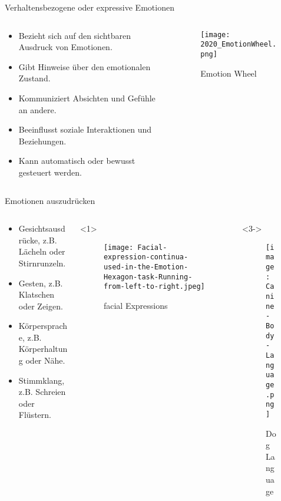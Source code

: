 \documentclass[aspectratio=169]{beamer}
\begin{document}
\begin{frame}{Verhaltensbezogene oder expressive Emotionen}
  \begin{columns}
    \begin{column}{0.7\textwidth}
      \begin{itemize}
        \item Bezieht sich auf den sichtbaren Ausdruck von Emotionen.
        \item Gibt Hinweise über den emotionalen Zustand.
        \item Kommuniziert Absichten und Gefühle an andere.
        \item Beeinflusst soziale Interaktionen und Beziehungen.
        \item Kann automatisch oder bewusst gesteuert werden.
      \end{itemize}
    \end{column}
    \begin{column}{0.3\textwidth}
      \begin{figure}[h]
        \centering
        \texttt{[image: 2020\_EmotionWheel.png]}
        \caption{Emotion Wheel}
      \end{figure}
    \end{column}
  \end{columns}
\end{frame}

\begin{frame}{Emotionen auszudrücken}
  \begin{columns}
    \begin{column}{0.7\textwidth}
      \begin{itemize}
        \item<1-> Gesichtsausdrücke, z.B. Lächeln oder Stirnrunzeln.
        \item<2-> Gesten, z.B. Klatschen oder Zeigen.
        \item<3-> Körpersprache, z.B. Körperhaltung oder Nähe.
        \item<4-> Stimmklang, z.B. Schreien oder Flüstern.
      \end{itemize}
    \end{column}
    \begin{column}{0.3\textwidth}<1>
      \begin{figure}[h]
        \centering
        \texttt{[image: Facial-expression-continua-used-in-the-Emotion-Hexagon-task-Running-from-left-to-right.jpeg]}
        \caption{facial Expressions~\cite{facialExpressionRecognition} }
      \end{figure}
    \end{column}
    \begin{column}{0.3\textwidth}<3->
      \begin{figure}[h]
        \centering
        \texttt{[image: Canine-Body-Language.png]}
        \caption{Dog Language~\cite{doggieLanguage} }
      \end{figure}
    \end{column}
  \end{columns}
\end{frame}
\end{document}
